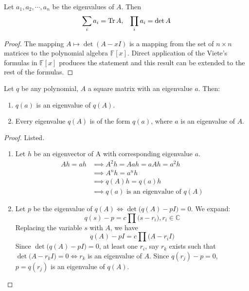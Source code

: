   \begin{theorem} 
    Let $a_1, a_2, \cdots, a_n$ be the eigenvalues of $A$. Then 
    \[\sum_i a_i = \operatorname{Tr}{A}, \;\;\; \prod_i a_i = \det{A}\]
  \end{theorem}
  \begin{proof}
    The mapping $A \mapsto \det{(A - x I)}$ is a mapping from the set of $n \times n$ matrices to the polynomial algebra $\mathbb{F}[x]$. Direct application of the Viete's formulas in $\mathbb{F}[x]$ produces the statement and this result can be extended to the rest of the formulas. 
  \end{proof}

  \begin{theorem}
    Let $q$ be any polynomial, $A$ a square matrix with an eigenvalue $a$. Then: 
    \begin{enumerate}
      \item $q(a)$ is an eigenvalue of $q(A)$. 
      \item Every eigenvalue $q(A)$ is of the form $q(a)$, where $a$ is an eigenvalue of $A$. 
    \end{enumerate}
  \end{theorem}
  \begin{proof} 
    Listed. 
    \begin{enumerate}
      \item Let $h$ be an eigenvector of A with corresponding eigenvalue $a$. 
      \begin{align*}
          Ah = ah & \implies A^{2} h = Aah = aAh = a^{2} h \\
           & \implies A^{n} h = a^{n} h   \\
           & \implies q(A)h = q(a)h \\
           & \implies q(a) \text{ is an eigenvalue of }q(A)
      \end{align*}
      \item Let $p$ be the eigenvalue of $q(A) \iff \det{\big(q(A) - p I\big)} = 0$. We expand: 
        \begin{equation}
          q(s) - p = c\prod \big(s-r_{i}\big), r_{i} \in \mathbb{C}
        \end{equation}
        Replacing the variable $s$ with $A$, we have
        \begin{equation}
          q(A) - pI = c \prod \big(A-r_{i}I\big)
        \end{equation}
        Since $\det{\big( q(A) - pI\big)} = 0$, at least one $r_{i}$, say $r_{k}$ exists such that $\det{\big( A - r_{k} I \big)} = 0 \iff r_{k}$ is an eigenvalue of $A$. Since $q(r_{j})-p = 0$, $p = q(r_{j})$ is an eigenvalue of $q(A)$. 
    \end{enumerate}
  \end{proof}


